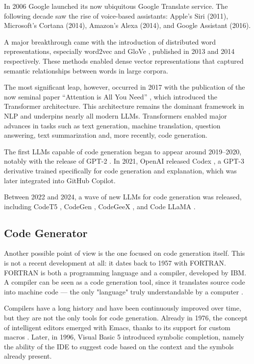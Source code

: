 In 2006 Google launched its now ubiquitous Google 
Translate service. The following decade saw the rise of voice-based 
assistants: Apple’s Siri (2011), Microsoft’s Cortana (2014), 
Amazon’s Alexa (2014), and Google Assistant (2016).

A major breakthrough came with the introduction of distributed word 
representations, especially word2vec \cite{mikolov2013efficient} and 
GloVe \cite{pennington2014glove}, published in 2013 and 2014 respectively. 
These methods enabled dense vector representations that captured semantic 
relationships between words in large corpora.

The most significant leap, however, occurred in 2017 with the publication 
of the now seminal paper “Attention is All You Need” 
\cite{vaswani2017attention}, which introduced the Transformer 
architecture. This architecture remains the dominant framework in 
NLP and underpins nearly all modern LLMs. Transformers enabled major 
advances in tasks such as text generation, machine translation, 
question answering, text summarization and, more recently, code 
generation.

The first LLMs capable of code generation began to appear around 
2019–2020, notably with the release of GPT-2 \cite{radford2019language}. 
In 2021, OpenAI released Codex \cite{chen2021codex}, a GPT-3 derivative 
trained specifically for code generation and explanation, which was
later integrated into GitHub Copilot.

Between 2022 and 2024, a wave of new LLMs for code generation was 
released, including CodeT5 \cite{wang2021codet5}, CodeGen 
\cite{nijkamp2022codegen}, CodeGeeX \cite{zeng2022codegeex}, 
and Code LLaMA \cite{roziere2023code}.


\subsection{Code Generator} %
Another possible point of view is the one focused on code 
generation itself. This is not a recent development at all: 
it dates back to 1957 with FORTRAN. FORTRAN is both a 
programming language and a compiler, developed by IBM. 
A compiler can be seen as a code generation tool, since it 
translates source code into machine code — the only "language" 
truly understandable by a computer \cite{backus1957fortran}.

Compilers have a long history and have been continuously 
improved over time, but they are not the only tools for code 
generation. Already in 1976, the concept of intelligent editors 
emerged with Emacs, thanks to its support for custom macros 
\cite{stallman1981emacs}. Later, in 1996, Visual Basic 5 
introduced symbolic completion, namely the ability of the IDE 
to suggest code based on the context and the symbols already present.

